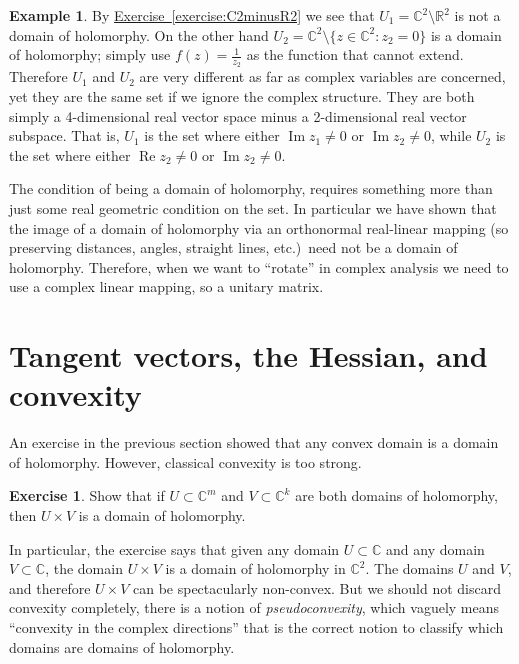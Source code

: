 \documentclass[12pt,openany]{book}
\renewcommand{\Re}{\operatorname{Re}}
\renewcommand{\Im}{\operatorname{Im}}
\newcommand{\C}{{\mathbb{C}}}
\newcommand{\R}{{\mathbb{R}}}
\theoremstyle{plain}
\theoremstyle{remark}
\theoremstyle{definition}
\newenvironment{exbox}{%
    \def\FrameCommand{\vrule width 1pt \relax\hspace {10pt}}%
    \MakeFramed {\advance \hsize -\width \FrameRestore }%
}{%
    \endMakeFramed
}
\theoremstyle{exercise}
\newtheorem{exercise}{Exercise}[section]
\theoremstyle{example}
\newtheorem{example}[thm]{Example}
\newcommand{\exerciseref}[1]{\hyperref[#1]{Exercise~\ref*{#1}}}
\begin{document}
\begin{example}
By
\exerciseref{exercise:C2minusR2} we see
that
$U_1 = \C^2 \setminus \R^2$
is not a domain of holomorphy.  On the other hand
$U_2 = \C^2 \setminus \{ z \in \C^2 : z_2 = 0 \}$ is a domain of holomorphy;
simply
use $f(z) = \frac{1}{z_2}$ as the function that cannot extend.
Therefore $U_1$ and $U_2$ are very different as far as complex variables are
concerned, yet they are the same set if we ignore the complex structure.
They are both simply a 4-dimensional real vector space minus a 2-dimensional
real vector subspace.  That is, $U_1$ is the set
where either $\Im z_1 \not= 0$ or $\Im z_2 \not= 0$,
while $U_2$ is the set
where either $\Re z_2 \not= 0$ or $\Im z_2 \not= 0$.

The condition of being a domain of holomorphy,
requires something more than just some real geometric condition on the
set.  In particular we have shown that the image of a domain of holomorphy
via an orthonormal
real-linear mapping 
(so preserving distances, angles, straight lines,
etc.)\ need not be a domain of holomorphy.  Therefore, when we want to
``rotate'' in complex analysis we need to use a complex linear mapping,
so a unitary matrix.
\end{example}


\section{Tangent vectors, the Hessian, and convexity}

An exercise in the previous section showed that any convex domain is a
domain of holomorphy.  However, classical convexity is too strong.

\begin{exbox}
\begin{exercise}
Show that if $U \subset \C^m$ and $V \subset \C^k$ are both domains of
holomorphy, then $U \times V$ is a domain of holomorphy.
\end{exercise}
\end{exbox}

In particular, the exercise says that
given any domain $U \subset \C$ and any domain $V \subset \C$, the domain
$U \times V$ is a domain of holomorphy in $\C^2$.  The domains
$U$ and $V$, and therefore $U \times V$ can be spectacularly non-convex.
But we should not discard convexity completely, there is a notion of
\emph{pseudoconvexity}, which vaguely means ``convexity in the 
complex directions'' that is the correct notion to classify which
domains are domains of holomorphy.
\end{document}
